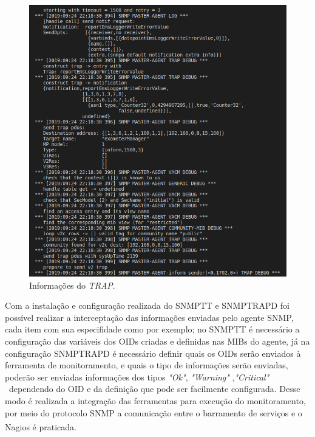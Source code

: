 \begin{figure}[h!]
	\begin{center}
	\includegraphics[scale = 0.75]{img/debugTrap.png}
	\caption{Informações do \textit{TRAP}.}
	\label{fun:fig:debugTrap}
	\end{center}
\end{figure}

Com a instalação e configuração realizada do \acrshort{SNMPTT} e SNMPTRAPD foi possível realizar a interceptação das informações enviadas pelo agente \acrshort{SNMP}, cada item com sua especifidade como por exemplo; no \acrshort{SNMPTT} é necessário a configuração das variáveis dos \acrshort{OID}s  criadas e definidas nas \acrshort{MIBs} do agente, já na configuração SNMPTRAPD é necessário definir quais os \acrshort{OID}s serão enviados à ferramenta de monitoramento, e quais o tipo de informações serão enviadas, poderão ser enviadas informações dos tipos  \textit{"Ok"}, \textit{"Warning"} ,\textit{"Critical"} \ dependendo do \acrshort{OID} e da definição que pode ser facilmente configurada. Desse modo é realizada a integração das ferramentas para execução do monitoramento, por meio do protocolo \acrshort{SNMP} a comunicação entre o barramento de serviços e o Nagios\textsuperscript{\textregistered} é praticada.  

